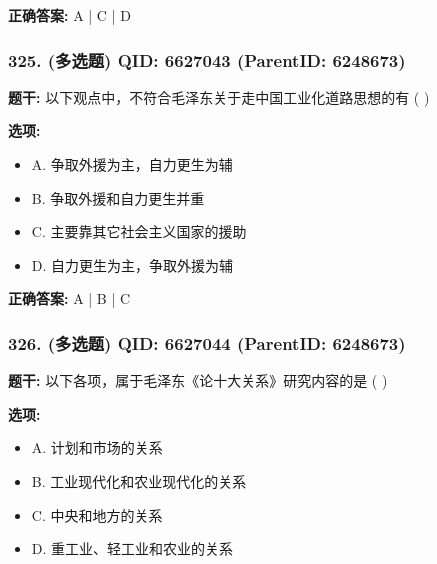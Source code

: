 \documentclass[12pt,UTF8]{ctexart}
\begin{document}
\textbf{正确答案:}
A | C | D

\vspace{0.3em}\hrulefill\vspace{0.7em}

\subsubsection*{325. (多选题) \small QID: 6627043 (ParentID: 6248673)}

\textbf{题干:}
以下观点中，不符合毛泽东关于走中国工业化道路思想的有  ( )



\textbf{选项:}
\begin{itemize}[leftmargin=*]

  \item A. 争取外援为主，自力更生为辅

  \item B. 争取外援和自力更生并重

  \item C. 主要靠其它社会主义国家的援助

  \item D. 自力更生为主，争取外援为辅

\end{itemize}

\textbf{正确答案:}
A | B | C

\vspace{0.3em}\hrulefill\vspace{0.7em}

\subsubsection*{326. (多选题) \small QID: 6627044 (ParentID: 6248673)}

\textbf{题干:}
以下各项，属于毛泽东《论十大关系》研究内容的是  ( )



\textbf{选项:}
\begin{itemize}[leftmargin=*]

  \item A. 计划和市场的关系

  \item B. 工业现代化和农业现代化的关系

  \item C. 中央和地方的关系

  \item D. 重工业、轻工业和农业的关系

\end{itemize}
\end{document}
